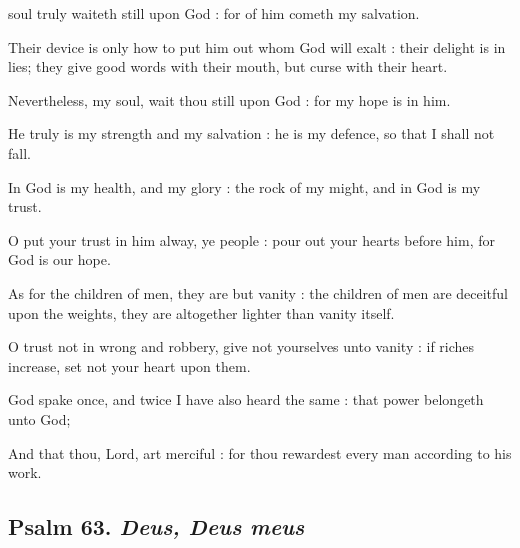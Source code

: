  soul truly waiteth still upon God : for of him cometh my salvation.\par
{}
Their device is only how to put him out whom God will exalt : their delight is in lies; they give good words with their mouth, but curse with their heart.\par
{}Nevertheless, my soul, wait thou still upon God : for my hope is in him.\par
{}He truly is my strength and my salvation : he is my defence, so that I shall not fall.\par
{}In God is my health, and my glory : the rock of my might, and in God is my trust.\par
{}O put your trust in him alway, ye people : pour out your hearts before him, for God is our hope.\par
{}As for the children of men, they are but vanity : the children of men are deceitful upon the weights, they are altogether lighter than vanity itself.\par
{}O trust not in wrong and robbery, give not yourselves unto vanity : if riches increase, set not your heart upon them.\par
{}God spake once, and twice I have also heard the same : that power belongeth unto God;\par
{}And that thou, Lord, art merciful : for thou rewardest every man according to his work.\par

\subsection{Psalm 63. \textit{Deus, Deus meus}}

